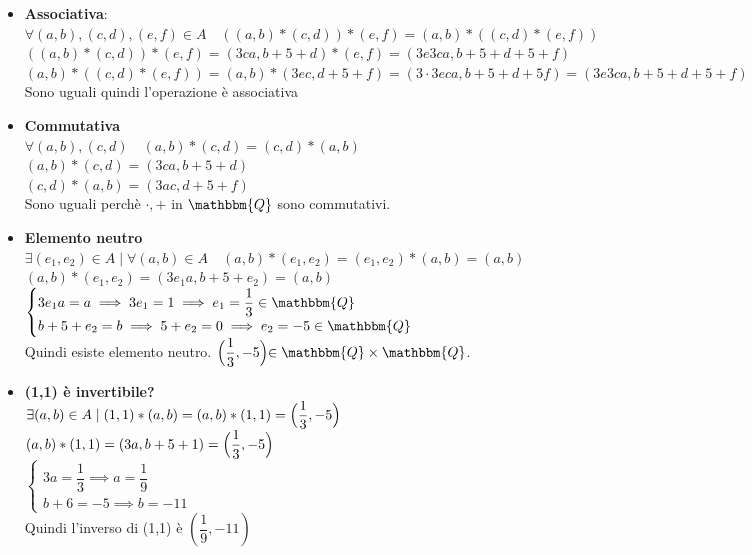 \documentclass[12pt, letterpaper]{report}
\begin{document}
		\begin{itemize}
			\item \textbf{Associativa}: \\
			$\forall (a,b),(c,d), (e,f) \in A \quad ((a,b) * (c,d)) * (e,f) = (a,b) * ((c,d) * (e,f))$ \\
			$((a,b) * (c,d)) * (e,f) = (3ca, b + 5 + d) * (e,f) = (3e3ca, b + 5 + d + 5 + f)$ \\
			$(a,b) * ((c,d) * (e,f)) = (a,b)*(3ec, d + 5 + f) = (3 \cdot 3eca, b + 5 + d + 5 f) = (3e3ca, b + 5 + d + 5 +f)$ \\
			Sono uguali quindi l'operazione è associativa
			\item \textbf{Commutativa} \\
			$\forall (a,b), (c,d) \quad (a,b)*(c,d) = (c,d)*(a,b)$ \\
			$(a,b)*(c,d) = (3ca, b + 5 +d)$ \\
			$(c,d) * (a,b) = (3ac, d + 5 + f)$ \\
			Sono uguali perchè $\cdot, +$ in $\mathbbm{Q}$ sono commutativi.
			\item \textbf{Elemento neutro} \\
			$\exists (e_1, e_2) \in A \mid \forall (a,b) \in A \quad (a,b)*(e_1,e_2)=(e_1, e_2) * (a,b) = (a,b)$ \\
			$(a,b)*(e_1,e_2) = (3e_1a, b+ 5 + e_2) = (a,b)$ \\
			$\begin{cases}
				3e_1a=a \implies 3e_1 = 1 \implies e_1 = \dfrac{1}{3} \in \mathbbm{Q}\\
				b+5+e_2=b \implies 5 + e_2=0 \implies e_2=-5 \in \mathbbm{Q}
			\end{cases}$ \\
			Quindi esiste elemento neutro. $\Bigl(\dfrac{1}{3}, -5\Bigl) \in \mathbbm{Q} \times \mathbbm{Q}$.
			\item \textbf{(1,1) è invertibile?} \\
			$\exists (a,b) \in A \mid (1,1)*(a,b) = (a,b) * (1,1) = \Bigl(\dfrac{1}{3}, -5\Bigl)$ \\
			$(a,b) * (1,1) = (3a, b +5 +1) = \Bigl(\dfrac{1}{3}, -5\Bigl)$ \\
			$\begin{cases}
				3a = \dfrac{1}{3} \implies a = \dfrac{1}{9} \\
				b + 6 = -5 \implies b = -11
			\end{cases}$ \\
			Quindi l'inverso di (1,1) è $(\dfrac{1}{9}, -11)$ \\

\end{itemize}
\end{document}
